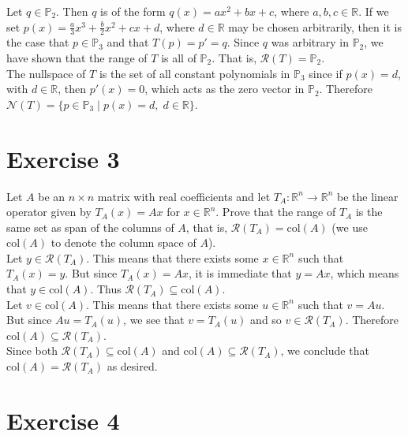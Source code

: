 \documentclass[11pt]{article}
\begin{document}
Let $q \in \mathbb{P}_2$. Then $q$ is of the form $q(x) = ax^2 + bx + c$, where $a,b,c \in \mathbb{R}$. If we set $p(x) = \frac{a}{3}x^3 + \frac{b}{2}x^2 + cx + d$, where $d \in \mathbb{R}$ may be chosen arbitrarily, then it is the case that $p \in \mathbb{P}_3$ and that $T(p) = p' = q$. Since $q$ was arbitrary in $\mathbb{P}_2$, we have shown that the range of $T$ is all of $\mathbb{P}_2$. That is, $\mathcal{R}(T) = \mathbb{P}_2$. \\

The nullspace of $T$ is the set of all constant polynomials in $\mathbb{P}_3$ since if $p(x) = d$, with $d \in \mathbb{R}$, then $p'(x) = 0$, which acts as the zero vector in $\mathbb{P}_2$. Therefore $\mathcal{N}(T) = \{p \in \mathbb{P}_3 \; | \; p(x) = d, \; d \in \mathbb{R}\}$. 

\section*{Exercise 3}

Let $A$ be an $n\times n$ matrix with real coefficients and let $T_A : \mathbb{R}^n \rightarrow \mathbb{R}^n$ be the linear operator given by $T_A(x) = Ax$ for $x \in \mathbb{R}^n$. Prove that the range of $T_A$ is the same set as span of the columns of $A$, that is, $\mathcal{R}(T_A) = \text{col}(A)$ (we use $\text{col}(A)$ to denote the column space of $A$).\\

Let $y \in \mathcal{R}(T_A)$. This means that there exists some $x \in \mathbb{R}^n$ such that $T_A(x) = y$. But since $T_A(x) = Ax$, it is immediate that $y = Ax$, which means that $y \in \text{col}(A)$. Thus $\mathcal{R}(T_A) \subseteq \text{col}(A)$. \\

Let $v \in \text{col}(A)$. This means that there exists some $u \in \mathbb{R}^n$ such that $v = Au$. But since $Au = T_A(u)$, we see that $v = T_A(u)$ and so $v \in \mathcal{R}(T_A)$. Therefore $\text{col}(A) \subseteq \mathcal{R}(T_A)$. \\

Since both $\mathcal{R}(T_A) \subseteq \text{col}(A)$ and $\text{col}(A) \subseteq \mathcal{R}(T_A)$, we conclude that $\text{col}(A) = \mathcal{R}(T_A)$ as desired.

\section*{Exercise 4}
\end{document}
